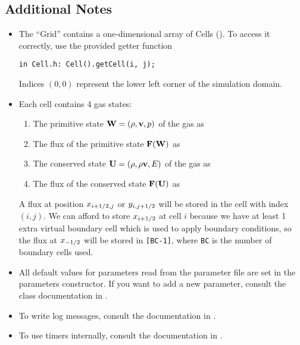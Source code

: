 \subsection{Additional Notes}


\begin{itemize}
\item The ``Grid'' contains a one-dimensional array of Cells
(). To access it correctly, use the provided getter
function
%
\begin{lstlisting}
in Cell.h: Cell().getCell(i, j);
\end{lstlisting}
%
Indices $(0, 0)$ represent the lower left corner of the simulation domain.


\item Each cell contains 4 gas states:

\begin{enumerate}
\item The primitive state $\mathbf{W} = (\rho, \mathbf{v}, p)$ of the gas as 
\item The flux of the primitive state $\mathbf{F}(\mathbf{W})$ as 
\item The conserved state $\mathbf{U} = (\rho, \rho \mathbf{v}, E)$ of the gas as 
\item The flux of the conserved state $\mathbf{F}(\mathbf{U})$ as 
\end{enumerate}

A flux at position $x_{i+1/2, j}$ or $y_{i, j+1/2}$ will be stored in the
cell with index $(i, j)$.
We can afford to store $x_{i+1/2}$ at cell $i$ because we have at least 1
extra virtual boundary cell which is used to apply boundary conditions, so the
flux at $x_{-1/2}$ will be stored in \verb|[BC-1]|, where \texttt{BC} is
the number of boundary cells used.


\item All default values for parameters read from the parameter file are set in
the parameters constructor. If you want to add a new parameter, consult the
class documentation in .

\item To write log messages, consult the documentation in .

\item To use timers internally, consult the documentation in .

\end{itemize}
